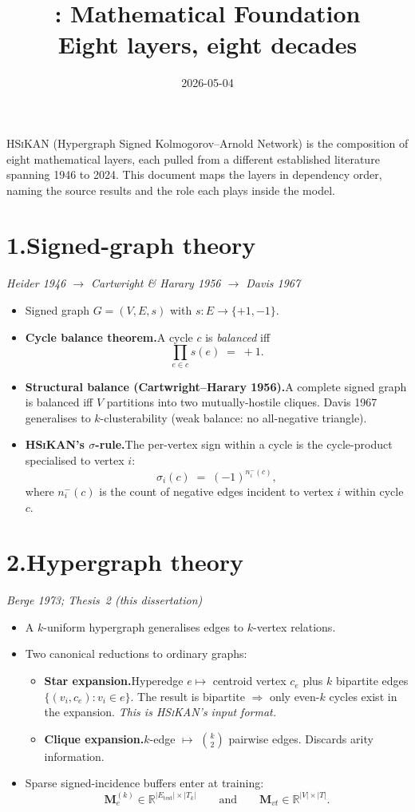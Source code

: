 \documentclass[11pt,a4paper]{article}
\title{\HSiKAN: Mathematical Foundation\\
\large {\normalfont Eight layers, eight decades}}
\author{}
\date{2026-05-04}
\newcommand{\HSiKAN}{\textsc{HSiKAN}}
\begin{document}
\maketitle

\noindent
\HSiKAN{} (Hypergraph Signed Kolmogorov--Arnold Network) is the
composition of eight mathematical layers, each pulled from a
different established literature spanning 1946 to 2024.  This
document maps the layers in dependency order, naming the source
results and the role each plays inside the model.

\section*{1.\;Signed-graph theory}
\textit{Heider 1946 \(\to\) Cartwright \& Harary 1956 \(\to\) Davis 1967}

\begin{itemize}
\item Signed graph $G = (V, E, s)$ with $s : E \to \{+1, -1\}$.
\item \textbf{Cycle balance theorem.}\;A cycle $c$ is \emph{balanced}
  iff
  \[
    \prod_{e \in c} s(e) \;=\; +1.
  \]
\item \textbf{Structural balance (Cartwright--Harary 1956).}\;A
  complete signed graph is balanced iff $V$ partitions into two
  mutually-hostile cliques.  Davis 1967 generalises to
  $k$-clusterability (weak balance: no all-negative triangle).
\item \textbf{\HSiKAN's $\sigma$-rule.}\;The per-vertex sign within
  a cycle is the cycle-product specialised to vertex $i$:
  \[
    \sigma_i(c) \;=\; (-1)^{n_i^{-}(c)},
  \]
  where $n_i^{-}(c)$ is the count of negative edges incident to
  vertex $i$ within cycle $c$.
\end{itemize}

\section*{2.\;Hypergraph theory}
\textit{Berge 1973; Thesis~2 (this dissertation)}

\begin{itemize}
\item A $k$-uniform hypergraph generalises edges to $k$-vertex
  relations.
\item Two canonical reductions to ordinary graphs:
  \begin{itemize}
  \item \textbf{Star expansion.}\;Hyperedge $e \mapsto$ centroid
    vertex $c_e$ plus $k$ bipartite edges
    $\{(v_i, c_e) : v_i \in e\}$.  The result is bipartite
    $\Rightarrow$ only even-$k$ cycles exist in the expansion.
    \emph{This is \HSiKAN's input format.}
  \item \textbf{Clique expansion.}\;$k$-edge $\mapsto$
    $\binom{k}{2}$ pairwise edges.  Discards arity information.
  \end{itemize}
\item Sparse signed-incidence buffers enter at training:
  \[
    \mathbf{M}_e^{(k)} \in \mathbb{R}^{|E_{\text{test}}| \times |T_k|}
    \qquad\text{and}\qquad
    \mathbf{M}_{vt} \in \mathbb{R}^{|V| \times |T|}.
  \]
\end{itemize}
\end{document}
